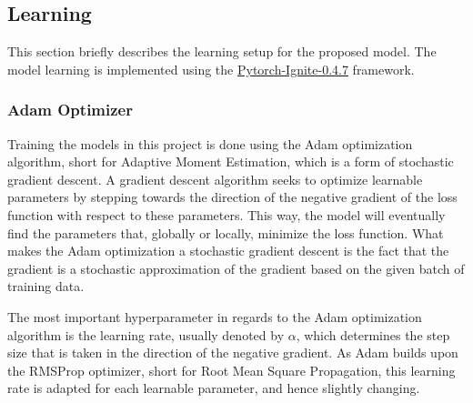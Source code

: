 



\subsection{Learning}
\label{sec:Method:Learning}
This section briefly describes the learning setup for the proposed model.
The model learning is implemented using the \hyperlink{https://pytorch.org/ignite/}{Pytorch-Ignite-0.4.7}\cite{IgniteDocumentation} framework.


\subsubsection{Adam Optimizer}
\label{sec:Method:Learning:Adam}
Training the models in this project is done using the Adam optimization algorithm, short for Adaptive Moment Estimation, which is a form of stochastic gradient descent.
A gradient descent algorithm seeks to optimize learnable parameters by stepping towards the direction of the negative gradient of the loss function with respect to these parameters.
This way, the model will eventually find the parameters that, globally or locally, minimize the loss function.
What makes the Adam optimization a stochastic gradient descent is the fact that the gradient is a stochastic approximation of the gradient based on the given batch of training data.

The most important hyperparameter in regards to the Adam optimization algorithm is the learning rate, usually denoted by $\alpha$, which determines the step size that is taken in the direction of the negative gradient. 
As Adam builds upon the RMSProp optimizer, short for Root Mean Square Propagation, this learning rate is adapted for each learnable parameter, and hence slightly changing.







